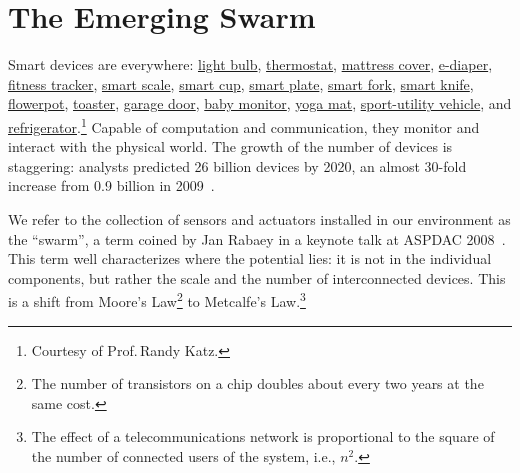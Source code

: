 \section{The Emerging Swarm}
\label{sec:emerging-swarm}

Smart devices are everywhere: \href{http://ilumi.co/}{light bulb},
\href{https://nest.com/}{thermostat}, \href{http://lunasleep.com/}{mattress
  cover}, \href{https://www.indiegogo.com/projects/smart-diapers}{e-diaper},
\href{https://www.fitbit.com/}{fitness tracker},
\href{https://www.fitbit.com/aria}{smart scale},
\href{https://www.myvessyl.com/}{smart cup},
\href{https://www.kickstarter.com/projects/1816678675/smartplate-instantly-track-and-analyze-everything}{smart
  plate},
\href{http://www.amazon.com/HAPILABS-102-HAPIfork-Bluetooth-Enabled-Smart/dp/B00FRPCPEC}{smart
  fork}, \href{http://electroluxdesignlab.com/en/submission/smart-knife/}{smart
  knife},
\href{http://www.clickandgrow.com/pages/what-is-click-grow}{flowerpot},
\href{http://www.williams-sonoma.com/products/breville-die-cast-2-slice-stainless-steel-smart-toaster/}{toaster},
\href{https://garageio.com/}{garage door},
\href{http://www2.withings.com/us/en/products/baby/smart-baby-monitor}{baby
  monitor},
\href{https://www.indiegogo.com/projects/smartmat-the-world-s-first-intelligent-yoga-mat}{yoga
  mat},
\href{http://usnews.rankingsandreviews.com/cars-trucks/best-cars-blog/2013/02/2015_GM_Vehicles_Will_Get_Wi-Fi_Internet_Access/}{sport-utility
  vehicle}, and
\href{http://www.samsung.com/us/appliances/refrigerators/RF28HMELBSR/AA}{refrigerator}.\footnote{Courtesy
  of Prof.\,Randy Katz.} Capable of computation and communication, they monitor
and interact with the physical world.  The growth of the number of devices is
staggering: analysts predicted 26 billion devices by 2020, an almost 30-fold
increase from 0.9 billion in 2009~\cite{middleton2013forecast}.

We refer to the collection of sensors and actuators installed in our environment
as the ``swarm'', a term coined by Jan Rabaey in a keynote talk at ASPDAC
2008~\cite{rabaey2008brand}. This term well characterizes where the potential
lies: it is not in the individual components, but rather the scale and the number
of interconnected devices. This is a shift from Moore's Law\footnote{The number
  of transistors on a chip doubles about every two years at the same cost.} to
Metcalfe's Law.\footnote{The effect of a telecommunications network is
  proportional to the square of the number of connected users of the system,
  i.e., $n^2$.}

